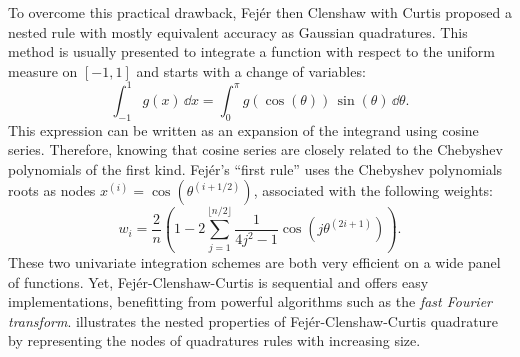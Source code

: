 To overcome this practical drawback, Fejér then Clenshaw with Curtis proposed a nested rule with mostly equivalent accuracy as Gaussian quadratures.
This method is usually presented to integrate a function with respect to the uniform measure on $[-1, 1]$ and starts with a change of variables:
\begin{equation}
    \int_{-1}^{1} g(x) \, \dd x = \int_{0}^{\pi} g\left(\cos(\theta)\right) \, \sin(\theta) \, \dd \theta. 
\end{equation}
This expression can be written as an expansion of the integrand using cosine series. 
Therefore, knowing that cosine series are closely related to the Chebyshev polynomials of the first kind. 
Fejér's ``first rule'' \citep{trefethen_2008} uses the Chebyshev polynomials roots as nodes $x^{(i)} = \cos(\theta^{(i+1/2)})$, associated with the following weights:
\begin{equation}
    w_i=\frac{2}{n}\left(1-2\sum_{j=1}^{\lfloor n/2 \rfloor}\frac{1}{4j^2-1}\cos\left(j\theta^{(2i+1)}\right)\right).    
\end{equation}
These two univariate integration schemes are both very efficient on a wide panel of functions. 
Yet, Fejér-Clenshaw-Curtis is sequential and offers easy implementations, benefitting from powerful algorithms such as the \textit{fast Fourier transform}. 
 illustrates the nested properties of Fejér-Clenshaw-Curtis quadrature by representing the nodes of quadratures rules with increasing size.  

